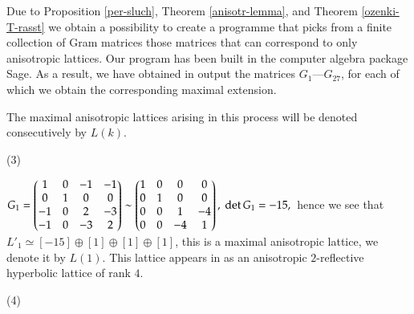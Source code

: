 \documentclass[14pt]{article}
\begin{document}

Due to Proposition \ref{per-sluch}, Theorem \ref{anisotr-lemma},
and Theorem \ref{ozenki-T-rasst} we obtain a possibility
to create a programme that picks
from a finite collection of Gram matrices  those matrices that
can correspond to only anisotropic lattices. Our program has been
built in the computer algebra package Sage. As a result, we have
obtained in output the
matrices $G_1$---$G_{27}$, for each of which we obtain the
corresponding maximal extension.

The maximal anisotropic lattices  arising in this process  will be denoted
consecutively by  $L(k)$.

\begin{small} 

\vskip 1cm

(3)

\vskip 1cm

$
G_{1} =
\begin{pmatrix}
1 & 0 & -1 & -1\\
0 & 1 & 0 & 0\\
-1 & 0 & 2 & -3\\
-1 & 0 & -3 & 2
\end{pmatrix} \sim
\begin{pmatrix}
1 & 0 & 0 & 0\\
0 & 1 & 0 & 0\\
0 & 0 & 1 & -4\\
0 & 0 & -4 & 1
\end{pmatrix}, \ \det G_1 = -15, \\
$
hence we see that $L'_1 \simeq [-15] \oplus [1] \oplus [1] \oplus [1]$,
this is a maximal anisotropic lattice, we denote it by $L(1)$.
This lattice appears in \cite{vinberg07classhyplat} as an anisotropic
$2$-reflective hyperbolic lattice of rank $4$.

\vskip 1cm

(4)

\vskip 1cm


\end{small}
\end{document}
